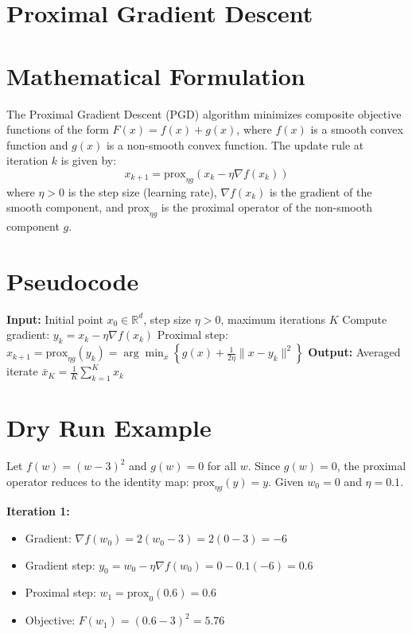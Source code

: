 \documentclass{article}
\begin{document}
\section*{Proximal Gradient Descent}
\section*{Mathematical Formulation}
The Proximal Gradient Descent (PGD) algorithm minimizes composite objective functions of the form $F(x) = f(x) + g(x)$, where $f(x)$ is a smooth convex function and $g(x)$ is a non-smooth convex function. The update rule at iteration $k$ is given by:
\begin{equation}
x_{k+1} = \text{prox}_{\eta g} \left( x_k - \eta \nabla f(x_k) \right)
\end{equation}
where $\eta > 0$ is the step size (learning rate), $\nabla f(x_k)$ is the gradient of the smooth component, and $\text{prox}_{\eta g}$ is the proximal operator of the non-smooth component $g$.

\section*{Pseudocode}
\begin{algorithm}[H]
\caption{Proximal Gradient Descent}
\begin{algorithmic}[1]
\State \textbf{Input:} Initial point $x_0 \in \mathbb{R}^d$, step size $\eta > 0$, maximum iterations $K$
\State Compute gradient: $y_k = x_k - \eta \nabla f(x_k)$
\State Proximal step: $x_{k+1} = \text{prox}_{\eta g}(y_k) = \arg\min_{x} \left\{ g(x) + \frac{1}{2\eta} \|x - y_k\|^2 \right\}$
\EndFor
\State \textbf{Output:} Averaged iterate $\bar{x}_K = \frac{1}{K}\sum_{k=1}^K x_k$
\end{algorithmic}
\end{algorithm}

\section*{Dry Run Example}
Let $f(w) = (w-3)^2$ and $g(w) = 0$ for all $w$. Since $g(w) = 0$, the proximal operator reduces to the identity map: $\text{prox}_{\eta g}(y) = y$. Given $w_0 = 0$ and $\eta = 0.1$.

\textbf{Iteration 1:}
\begin{itemize}
\item Gradient: $\nabla f(w_0) = 2(w_0 - 3) = 2(0 - 3) = -6$
\item Gradient step: $y_0 = w_0 - \eta \nabla f(w_0) = 0 - 0.1(-6) = 0.6$
\item Proximal step: $w_1 = \text{prox}_{0}(0.6) = 0.6$
\item Objective: $F(w_1) = (0.6 - 3)^2 = 5.76$
\end{itemize}
\end{document}
